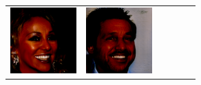 \documentclass{article}
\newcommand{\pganw}{1.0in}
\begin{document}
\begin{table}[htbp]
\begin{center}
\begin{tabular}{cc|cc|cc}
\includegraphics[width=\pganw]{figures/pgan/12_base_iso_MH.png} &
\includegraphics[width=\pganw]{figures/pgan/13_base_iso_MH.png} \\

\end{tabular}
\end{center}
\end{table}
\end{document}
